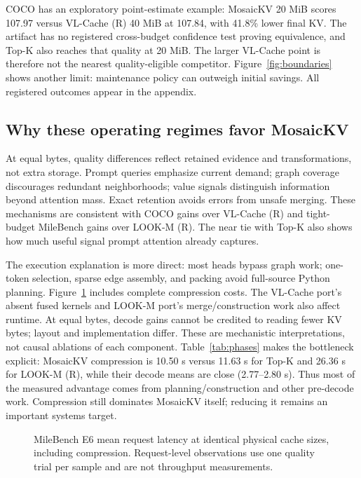 COCO has an exploratory point-estimate example: MosaicKV 20 MiB scores
107.97 versus VL-Cache (R) 40 MiB at 107.84, with 41.8\% lower final KV.
The artifact has no registered cross-budget confidence test proving
equivalence, and Top-K also reaches that quality at 20 MiB.
The larger VL-Cache point is therefore not the nearest quality-eligible
competitor. Figure~\ref{fig:boundaries} shows another limit: maintenance
policy can outweigh initial savings. All registered outcomes appear in
the appendix.

\subsection{Why these operating regimes favor MosaicKV}
\begin{table}[t]
\caption{MileBench E6 phase means at 40 MiB. Compression includes recorded
planning and construction work. Other request phases account for the
difference between compression plus decode and end-to-end time.}
\label{tab:phases}
\centering\small\resizebox{\columnwidth}{!}{}
\end{table}
At equal bytes, quality differences reflect retained evidence and
transformations, not extra storage. Prompt queries emphasize current demand;
graph coverage discourages redundant neighborhoods; value signals distinguish
information beyond attention mass. Exact retention avoids errors from unsafe
merging. These mechanisms are consistent with COCO gains over VL-Cache (R)
and tight-budget MileBench gains over LOOK-M (R). The near tie with Top-K
also shows how much useful signal prompt attention already captures.

The execution explanation is more direct: most heads bypass graph work;
one-token selection, sparse edge assembly, and packing avoid full-source
Python planning. Figure~\ref{fig:latency} includes complete compression costs.
The VL-Cache port's absent fused kernels and LOOK-M port's merge/construction
work also affect runtime. At equal bytes, decode gains cannot be credited to
reading fewer KV bytes; layout and implementation differ. These are
mechanistic interpretations, not causal ablations of each component.
Table~\ref{tab:phases} makes the bottleneck explicit: MosaicKV compression is
10.50 s versus 11.63 s for Top-K and 26.36 s for LOOK-M (R), while their
decode means are close (2.77--2.80 s). Thus most of the measured advantage
comes from planning/construction and other pre-decode work. Compression still
dominates MosaicKV itself; reducing it remains an important systems target.

\begin{figure}[t]
\centering
\caption{MileBench E6 mean request latency at identical physical cache sizes,
including compression. Request-level observations use one quality trial per
sample and are not throughput measurements.}
\label{fig:latency}
\end{figure}
